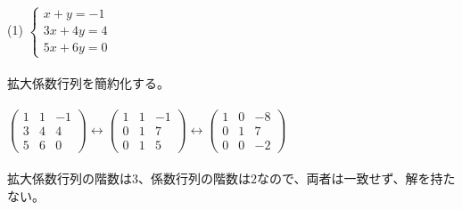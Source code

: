 \documentclass[fleqn]{jsarticle}
\begin{document}
    \begin{description}
		\setlength{\itemsep}{0.5cm}
        \begin{spacing}{1.2}

            \item[(1)]
            $ \left\{
                \begin{array}{l}
                    x + y = -1 \\
                    3x + 4y = 4 \\
                    5x + 6y = 0
                \end{array}
            \right. $ \\\\
            拡大係数行列を簡約化する。\\\\
                $ \left(
                    \begin{array}{cc|c}
                        1 & 1 & -1 \\
                        3 & 4 & 4 \\
                        5 & 6 & 0
                    \end{array}
                \right)
                \longleftrightarrow
                \left(
                    \begin{array}{cc|c}
                        1 & 1 & -1 \\
                        0 & 1 & 7 \\
                        0 & 1 & 5
                    \end{array}
                \right)
                \longleftrightarrow
                \left(
                    \begin{array}{cc|c}
                        1 & 0 & -8 \\
                        0 & 1 & 7 \\
                        0 & 0 & -2
                    \end{array}
                \right) $ \\\\
                拡大係数行列の階数は$3$、係数行列の階数は$2$なので、両者は一致せず、解を持たない。


\end{spacing}
\end{description}
\end{document}

